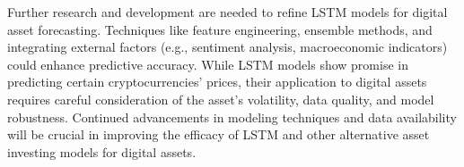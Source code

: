 Further research and development are needed to refine LSTM models for digital asset forecasting. Techniques like feature engineering, ensemble methods, and integrating external factors (e.g., sentiment analysis, macroeconomic indicators) could enhance predictive accuracy. While LSTM models show promise in predicting certain cryptocurrencies' prices, their application to digital assets requires careful consideration of the asset's volatility, data quality, and model robustness. Continued advancements in modeling techniques and data availability will be crucial in improving the efficacy of LSTM and other alternative asset investing models for digital assets.